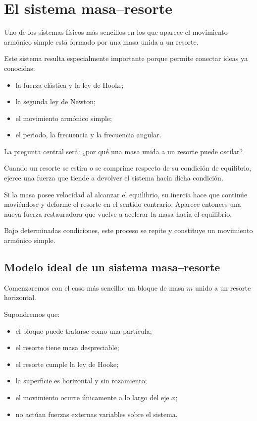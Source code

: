 ﻿\section{El sistema masa--resorte}

Uno de los sistemas físicos más sencillos en los que aparece el movimiento armónico simple está formado por una masa unida a un resorte.

Este sistema resulta especialmente importante porque permite conectar ideas ya conocidas:

\begin{itemize}
    \item la fuerza elástica y la ley de Hooke;
    \item la segunda ley de Newton;
    \item el movimiento armónico simple;
    \item el periodo, la frecuencia y la frecuencia angular.
\end{itemize}

La pregunta central será: ¿por qué una masa unida a un resorte puede oscilar?

\begin{idea}
Cuando un resorte se estira o se comprime respecto de su condición de equilibrio, ejerce una fuerza que tiende a devolver el sistema hacia dicha condición.

Si la masa posee velocidad al alcanzar el equilibrio, su inercia hace que continúe moviéndose y deforme el resorte en el sentido contrario. Aparece entonces una nueva fuerza restauradora que vuelve a acelerar la masa hacia el equilibrio.

Bajo determinadas condiciones, este proceso se repite y constituye un movimiento armónico simple.
\end{idea}


\subsection{Modelo ideal de un sistema masa--resorte}

Comenzaremos con el caso más sencillo: un bloque de masa \(m\) unido a un resorte horizontal.

Supondremos que:

\begin{itemize}
    \item el bloque puede tratarse como una partícula;
    \item el resorte tiene masa despreciable;
    \item el resorte cumple la ley de Hooke;
    \item la superficie es horizontal y sin rozamiento;
    \item el movimiento ocurre únicamente a lo largo del eje \(x\);
    \item no actúan fuerzas externas variables sobre el sistema.
\end{itemize}

